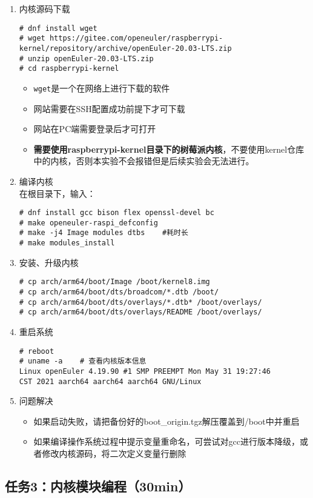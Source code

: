 \documentclass{article}
\begin{document}
\begin{enumerate}
    \item 内核源码下载
\begin{lstlisting}
# dnf install wget
# wget https://gitee.com/openeuler/raspberrypi-kernel/repository/archive/openEuler-20.03-LTS.zip
# unzip openEuler-20.03-LTS.zip
# cd raspberrypi-kernel
\end{lstlisting}
\begin{itemize}
    \item \verb|wget|是一个在网络上进行下载的软件
    \item 网站需要在SSH配置成功前提下才可下载
    \item 网站在PC端需要登录后才可打开
    \item \textbf{需要使用raspberrypi-kernel目录下的树莓派内核}，不要使用kernel仓库中的内核，否则本实验不会报错但是后续实验会无法进行。
\end{itemize}


    \item 编译内核\\
    在根目录下，输入：
\begin{lstlisting}
# dnf install gcc bison flex openssl-devel bc
# make openeuler-raspi_defconfig
# make -j4 Image modules dtbs    #耗时长
# make modules_install
\end{lstlisting}
    \item 安装、升级内核
\begin{lstlisting}
# cp arch/arm64/boot/Image /boot/kernel8.img
# cp arch/arm64/boot/dts/broadcom/*.dtb /boot/          
# cp arch/arm64/boot/dts/overlays/*.dtb* /boot/overlays/
# cp arch/arm64/boot/dts/overlays/README /boot/overlays/
\end{lstlisting}
    \item 重启系统
\begin{lstlisting}
# reboot
# uname -a    # 查看内核版本信息
Linux openEuler 4.19.90 #1 SMP PREEMPT Mon May 31 19:27:46 
CST 2021 aarch64 aarch64 aarch64 GNU/Linux
\end{lstlisting}
    \item 问题解决
    \begin{itemize}
        \item 如果启动失败，请把备份好的boot\_origin.tgz解压覆盖到/boot中并重启
        \item 如果编译操作系统过程中提示变量重命名，可尝试对gcc进行版本降级，或者修改内核源码，将二次定义变量行删除
    \end{itemize}
\end{enumerate}

\newpage
\subsection{任务3：内核模块编程（30min）}
\end{document}
